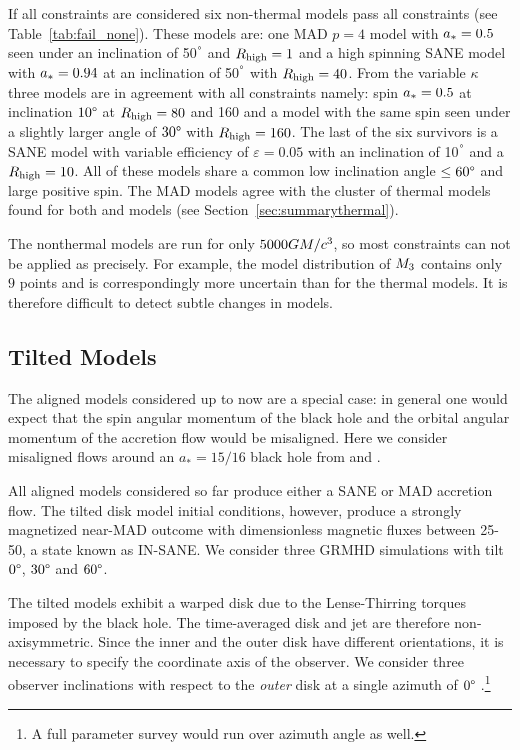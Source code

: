 

If all constraints are considered six non-thermal models pass all constraints (see Table~\ref{tab:fail_none}).
These models are: one \hamr MAD $p=4$ model with $a_*=0.5$ seen under an inclination of 50$^\degree$ and  $R_\mathrm{high}=1$ and a high spinning SANE model with $a_*=0.94$ at an inclination of 50$^\degree$ with $R_\mathrm{high}=40$.
From the \bhac variable $\kappa$ three models are in agreement with all constraints namely: spin $a_*=0.5$ at inclination $10\degree$ at $R_\mathrm{high}=80$ and 160 and a model with the same spin seen under a slightly larger angle of $30\degree$ with $R_\mathrm{high}=160$.
The last of the six survivors is a \bhac SANE model with variable efficiency of  $\varepsilon=0.05$ with an inclination of 10$^\degree$ and a $R_\mathrm{high}=10$.
All of these models share a common low inclination angle $\leq 60\degree$ and large positive spin.
The MAD models agree with the cluster of thermal models found for both \bhac and \kharma models (see Section~\ref{sec:summarythermal}).



The nonthermal models are run for only $5000GM/c^3$, so most  constraints can not be applied as precisely.
For example, the model distribution of $M_{3}$ contains only $9$ points and is correspondingly more uncertain than for the thermal models.
It is therefore difficult to detect subtle changes in models.

\subsection{Tilted Models}

The aligned models considered up to now are a special case: in general one would expect that the spin angular momentum of the black hole and the orbital angular momentum of the accretion flow would be misaligned.
Here we consider misaligned flows around an $a_*=15/16$ black hole from \citet{Liska2018} and \citet{Chatterjee2020}.

All aligned models considered so far produce either a SANE or MAD accretion flow.
The tilted disk model initial conditions, however, produce a strongly magnetized near-MAD outcome with dimensionless magnetic fluxes between 25-50, a state known as IN-SANE.
We consider three GRMHD simulations with tilt $0\degree$, $30\degree$ and $60\degree$.

The tilted models exhibit a warped disk due to the Lense-Thirring torques imposed by the black hole.
The time-averaged disk and jet are therefore non-axisymmetric.
Since the inner and the outer disk have different orientations, it is necessary to specify the coordinate axis of the observer.
We consider three  observer inclinations with respect to the {\em outer} disk at a single azimuth of $0\degree$ \citep[for more details, see][]{Chatterjee2020}.\footnote{A full parameter survey would run over azimuth angle as well.}

